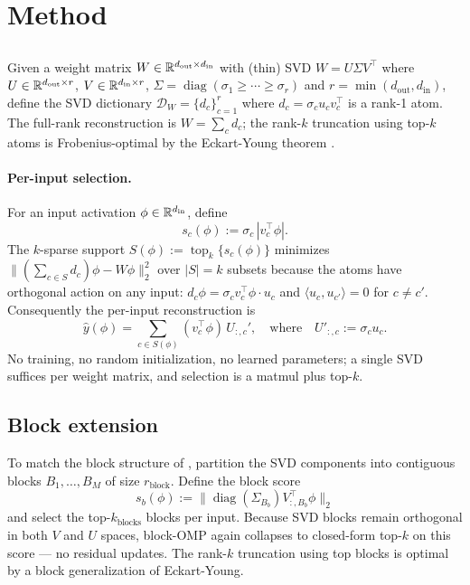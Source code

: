 \section{Method}
\label{sec:method}

\subsection{\svdomp}
\label{sec:svdomp}

Given a weight matrix $W \in \mathbb{R}^{d_\text{out} \times d_\text{in}}$ with (thin) SVD $W = U\Sigma V^\top$ where $U \in \mathbb{R}^{d_\text{out} \times r}$, $V \in \mathbb{R}^{d_\text{in} \times r}$, $\Sigma = \operatorname{diag}(\sigma_1 \geq \cdots \geq \sigma_r)$ and $r = \min(d_\text{out}, d_\text{in})$, define the SVD dictionary $\mathcal{D}_W = \{d_c\}_{c=1}^{r}$ where $d_c = \sigma_c u_c v_c^\top$ is a rank-1 atom. The full-rank reconstruction is $W = \sum_c d_c$; the rank-$k$ truncation using top-$k$ atoms is Frobenius-optimal by the Eckart-Young theorem \citep{eckart1936approximation}.

\paragraph{Per-input selection.} For an input activation $\phi \in \mathbb{R}^{d_\text{in}}$, define
\begin{equation}
s_c(\phi) := \sigma_c \, |v_c^\top \phi|.
\label{eq:score-def}
\end{equation}
The $k$-sparse support $S(\phi) := \operatorname{top}_k\{s_c(\phi)\}$ minimizes $\|(\sum_{c \in S} d_c)\phi - W\phi\|_2^2$ over $|S|=k$ subsets because the atoms have orthogonal action on any input: $d_c \phi = \sigma_c v_c^\top \phi \cdot u_c$ and $\langle u_c, u_{c'}\rangle = 0$ for $c \neq c'$. Consequently the per-input reconstruction is
\begin{equation}
\hat{y}(\phi) = \sum_{c \in S(\phi)} (v_c^\top \phi) \, U_{:,c}',
\quad \text{where} \quad U'_{:,c} := \sigma_c u_c.
\end{equation}
No training, no random initialization, no learned parameters; a single SVD suffices per weight matrix, and selection is a matmul plus top-$k$.

\subsection{Block extension}
\label{sec:block}

To match the block structure of \bsf, partition the SVD components into contiguous blocks $B_1, \dots, B_M$ of size $r_\text{block}$. Define the block score
\begin{equation}
s_b(\phi) := \|\operatorname{diag}(\Sigma_{B_b}) V_{:,B_b}^\top \phi\|_2
\label{eq:block-score}
\end{equation}
and select the top-$k_\text{blocks}$ blocks per input. Because SVD blocks remain orthogonal in both $V$ and $U$ spaces, block-OMP again collapses to closed-form top-$k$ on this score --- no residual updates. The rank-$k$ truncation using top blocks is optimal by a block generalization of Eckart-Young.

